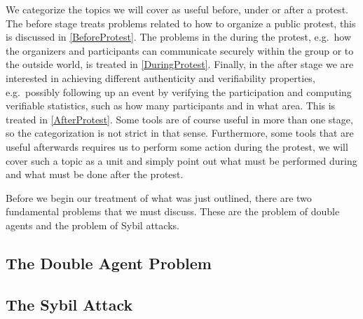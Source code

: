 We categorize the topics we will cover as useful before, under or after 
a protest.
The before stage treats problems related to how to organize a public protest, 
this is discussed in \cref{BeforeProtest}.
The problems in the during the protest, e.g.\ how the organizers and 
participants can communicate securely within the group or to the outside world, 
is treated in \cref{DuringProtest}.
Finally, in the after stage we are interested in achieving different 
authenticity and verifiability properties, e.g.\ possibly following up an event 
by verifying the participation and computing verifiable statistics, such as how 
many participants and in what area.
This is treated in \cref{AfterProtest}.
Some tools are of course useful in more than one stage, so the categorization 
is not strict in that sense.
Furthermore, some tools that are useful afterwards requires us to perform some 
action during the protest, we will cover such a topic as a unit and simply 
point out what must be performed during and what must be done after the 
protest.

Before we begin our treatment of what was just outlined, there are two 
fundamental problems that we must discuss.
These are the problem of double agents and the problem of Sybil attacks.

\subsection{The Double Agent Problem}
\label{DoubleAgentProblem}



\subsection{The Sybil Attack}
\label{SybilAttacks}



